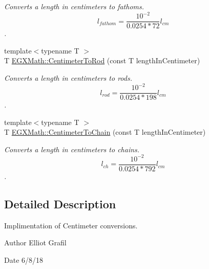 \begin{DoxyCompactItemize}
\begin{DoxyCompactList}\small\item\em Converts a length in centimeters to fathoms. \[ l_{fathom}= \frac{10^{-2}}{0.0254 * 72} l_{cm} \]. \end{DoxyCompactList}\item 
{\footnotesize template$<$typename T $>$ }\\T \mbox{\hyperlink{group___e_g_x_math-_conversions-_length_conversions-_s_i-_centimeter-_surveyors_gae8148fd547fed6b4308b4ba4b54c2273}{E\+G\+X\+Math\+::\+Centimeter\+To\+Rod}} (const T length\+In\+Centimeter)
\begin{DoxyCompactList}\small\item\em Converts a length in centimeters to rods. \[ l_{rod}= \frac{10^{-2}}{0.0254 * 198} l_{cm} \]. \end{DoxyCompactList}\item 
{\footnotesize template$<$typename T $>$ }\\T \mbox{\hyperlink{group___e_g_x_math-_conversions-_length_conversions-_s_i-_centimeter-_surveyors_gaec0a2935a1378c75c03f93d48794374a}{E\+G\+X\+Math\+::\+Centimeter\+To\+Chain}} (const T length\+In\+Centimeter)
\begin{DoxyCompactList}\small\item\em Converts a length in centimeters to chains. \[ l_{ch}= \frac{10^{-2}}{0.0254 * 792} l_{cm} \]. \end{DoxyCompactList}\end{DoxyCompactItemize}


\subsection{Detailed Description}
Implimentation of Centimeter conversions. 

\begin{DoxyAuthor}{Author}
Elliot Grafil 
\end{DoxyAuthor}
\begin{DoxyDate}{Date}
6/8/18 
\end{DoxyDate}

